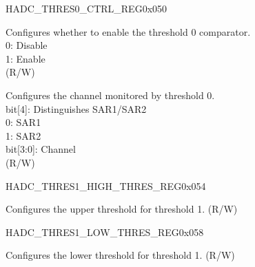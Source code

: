 \begin{register}{H}{ADC\_THRES0\_CTRL\_REG}{0x050}\label{regdesc:ADCTHRES0CTRLREG}
%
%
%
\regnewline%
\begin{regdesc}\begin{reglist}
\label{fielddesc:ADCTHRES0EN}\item [ADC\_THRES0\_EN] Configures whether to enable the threshold 0 comparator.\\
0: Disable\\
1: Enable\\
(R/W)
\label{fielddesc:ADCTHRES0CHANNEL}\item [ADC\_THRES0\_CHANNEL] Configures the channel monitored by threshold 0.\\
bit[4]: Distinguishes SAR1/SAR2\\
0: SAR1\\
1: SAR2\\
bit[3:0]: Channel\\
(R/W)
\end{reglist}\end{regdesc}
\end{register}


\begin{register}{H}{ADC\_THRES1\_HIGH\_THRES\_REG}{0x054}\label{regdesc:ADCTHRES1HIGHTHRESREG}
%
%
\regnewline%
\begin{regdesc}\begin{reglist}
\label{fielddesc:ADCTHRES1HIGH}\item [ADC\_THRES1\_HIGH] Configures the upper threshold for threshold 1. (R/W)
\end{reglist}\end{regdesc}
\end{register}


\begin{register}{H}{ADC\_THRES1\_LOW\_THRES\_REG}{0x058}\label{regdesc:ADCTHRES1LOWTHRESREG}
%
%
\regnewline%
\begin{regdesc}\begin{reglist}
\label{fielddesc:ADCTHRES1LOW}\item [ADC\_THRES1\_LOW] Configures the lower threshold for threshold 1. (R/W)
\end{reglist}\end{regdesc}
\end{register}


